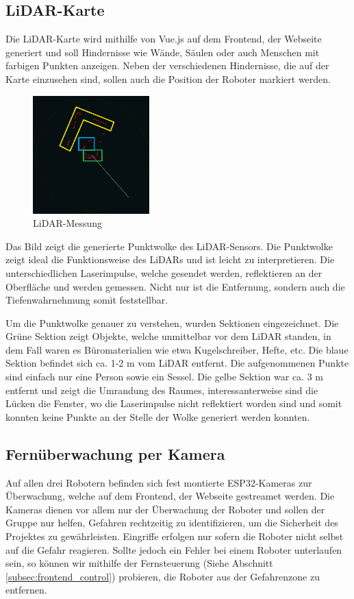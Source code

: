 \subsection{LiDAR-Karte}
\label{subsec:frontend_lidar_map}
Die LiDAR-Karte wird mithilfe von Vue.js auf dem Frontend, der Webseite generiert und soll Hindernisse wie Wände, Säulen oder auch Menschen mit farbigen Punkten anzeigen. 
Neben der verschiedenen Hindernisse, die auf der Karte einzusehen sind, sollen auch die Position der Roboter markiert werden. 
\begin{figure}[H]
    \includegraphics[width=0.4\textwidth, center]{img/LiDARMessungZeichnung_alt.png}
    \caption{LiDAR-Messung}
    \label{fig:LiDAR-Messung}
\end{figure}
Das Bild zeigt die generierte Punktwolke des LiDAR-Sensors. Die Punktwolke zeigt ideal die Funktionsweise des LiDARs und ist leicht zu interpretieren. 
Die unterschiedlichen Laserimpulse, welche gesendet werden, reflektieren an der Oberfläche und werden gemessen. Nicht nur ist die Entfernung, sondern auch die Tiefenwahrnehmung somit feststellbar.

Um die Punktwolke genauer zu verstehen, wurden Sektionen eingezeichnet. 
Die Grüne Sektion zeigt Objekte, welche unmittelbar vor dem LiDAR standen, in dem Fall waren es Büromaterialien wie etwa Kugelschreiber, Hefte, etc.
Die blaue Sektion befindet sich ca. 1-2 m vom LiDAR entfernt. Die aufgenommenen Punkte sind einfach nur eine Person sowie ein Sessel.
Die gelbe Sektion war ca. 3 m entfernt und zeigt die Umrandung des Raumes, interessanterweise sind die Lücken die Fenster, wo die Laserimpulse nicht reflektiert worden sind
und somit konnten keine Punkte an der Stelle der Wolke generiert werden konnten.

\subsection{Fernüberwachung per Kamera}
\label{subsec:frontend_cam_stream}
Auf allen drei Robotern befinden sich fest montierte ESP32-Kameras zur Überwachung, welche auf dem Frontend, der Webseite gestreamet werden.
Die Kameras dienen vor allem nur der Überwachung der Roboter und sollen der Gruppe nur helfen, Gefahren rechtzeitig zu identifizieren, um die Sicherheit des Projektes zu gewährleisten. Eingriffe erfolgen nur sofern die Roboter nicht selbst auf die Gefahr reagieren.
Sollte jedoch ein Fehler bei einem Roboter unterlaufen sein, so können wir mithilfe der Fernsteuerung (Siehe Abschnitt \ref{subsec:frontend_control}) probieren, die Roboter aus der Gefahrenzone zu entfernen.

